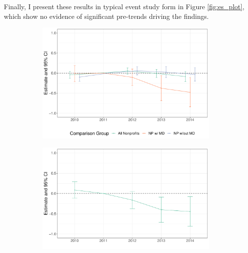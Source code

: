 \documentclass[12pt]{article}
\begin{document}
Finally, I present these results in typical event study form in Figure \ref{fig:es_plot}, which show no evidence of significant pre-trends driving the findings. 

\begin{figure}[ht!]
     \caption{TWFE Event Study Results}
     \centering
          \begin{subfigure}[b]{0.45\textwidth}
         \centering
         \caption{}
         \includegraphics[width=\textwidth]{Objects/read_forprofit_es_graph.pdf}
         \label{fig:es_plota}
     \end{subfigure}%
     \hfill
     \begin{subfigure}[b]{0.45\textwidth}
         \centering
         \caption{}
         \includegraphics[width=\textwidth]{Objects/read_MD_es_graph.pdf}
         \label{fig:es_plotb}
     \end{subfigure}%
     \vspace{5mm}
     \hfill
     \begin{subfigure}[b]{0.45\textwidth}

\end{subfigure}
\end{figure}
\end{document}
